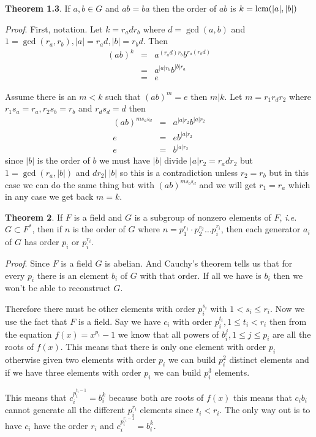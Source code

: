 \documentclass[aps,preprint,preprintnumbers,nofootinbib,showpacs,prd]{revtex4-1}
\newcommand{\ie}{{\it i.e.} }
\newcommand{\nbea}{\begin{eqnarray*}}
\newcommand{\neea}{\end{eqnarray*}}
\begin{document}
{\bf Theorem 1.3}. If $a,b \in G$ and $ab = ba$ then the order of $ab$ is $k = {\rm lcm}(|a|,|b|)$

{\it Proof}. First, notation. Let $k = r_a d r_b$ where $d = \gcd(a,b)$ and $1 = \gcd(r_a, r_b), |a| = r_a d, |b| = r_b d$. Then
%
\nbea
(ab)^k & = & a^{(r_a d) r_b} b^{r_a (r_b d)} \\
& = & a^{|a| r_b} b^{|b| r_a} \\
& = & e
\neea
%

Assume there is an $m < k$ such that $(ab)^m = e$ then $m | k$. Let $m = r_1 r_d r_2$ where $r_1 s_a =  r_a, r_2 s_b = r_b$ and $r_d s_d = d$ then 
%
\nbea
(ab)^{ms_a s_d} & = & a^{|a| r_2} b^{|a| r_2} \\
e & = & e b^{|a| r_2} \\
e & = & b^{|a| r_2}
\neea
%
since $|b|$ is the order of $b$ we must have $|b|$ divide $|a| r_2 = r_a d r_2$ but $1 = \gcd(r_a, |b|)$ and $d r_2 |~|b|$ so this is a contradiction unless $r_2 = r_b$ but in this case we can do the same thing but with $(ab)^{m s_b s_d}$ and we will get $r_1 = r_a$ which in any case we get back $m = k$.

{\bf Theorem 2}. If $F$ is a field and $G$ is a subgroup of nonzero elements of $F$, \ie $G \subset F^*$, then if $n$ is the order of $G$ where $n = p_1^{r_1} \cdot p_2^{r_2} \dots p_i^{r_i}$, then each generator $a_i$ of $G$ has order $p_i$ or $p_i^{r_i}$.

{\it Proof}. Since $F$ is a field $G$ is abelian. And Cauchy's theorem tells us that for every $p_i$ there is an element $b_i$ of $G$ with that order. If all we have is $b_i$ then we won't be able to reconstruct $G$.

Therefore there must be other elements with order $p_i^{s_i}$ with $1 < s_i \le r_i$. Now we use the fact that $F$ is a field. Say we have $c_i$ with order $p_i^{t_i}, 1 \le t_i < r_i$ then from the equation $f(x) = x^{p_i} - 1$ we know that all powers of $b_i^j, 1 \le j \le p_i$ are all the roots of $f(x)$. This means that there is only one element with order $p_i$ otherwise given two elements with order $p_i$ we can build $p^2_i$ distinct elements and if we have three elements with order $p_i$ we can build $p_i^3$ elements.

This means that $c_i^{p_i^{t_i - 1}} = b_i^k$ because both are roots of $f(x)$ this means that $c_i b_i$ cannot generate all the different $p_i^{r_i}$ elements since $t_i < r_i$. The only way out is to have $c_i$ have the order $r_i$ and $c_i^{p_i^{r_i - 1}} = b_i^k$.
\end{document}
